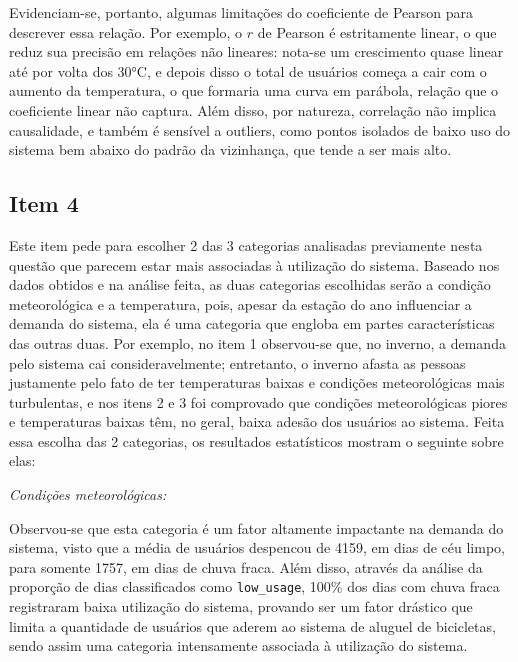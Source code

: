 \documentclass[a4paper, 12pt, titlepage]{article}
\begin{document}
Evidenciam-se, portanto, algumas limitações do coeficiente de Pearson para descrever essa relação. Por exemplo, o $r$ de Pearson é estritamente linear, o que reduz sua precisão em relações não lineares: nota-se um crescimento quase linear até por volta dos 30°C, e depois disso o total de usuários começa a cair com o aumento da temperatura, o que formaria uma curva em parábola, relação que o coeficiente linear não captura. Além disso, por natureza, correlação não implica causalidade, e também é sensível a outliers, como pontos isolados de baixo uso do sistema bem abaixo do padrão da vizinhança, que tende a ser mais alto.


\subsection*{Item 4}
Este item pede para escolher 2 das 3 categorias analisadas previamente nesta questão que parecem estar mais associadas à utilização do sistema. Baseado nos dados obtidos e na análise feita, as duas categorias escolhidas serão a condição meteorológica e a temperatura, pois, apesar da estação do ano influenciar a demanda do sistema, ela é uma categoria que engloba em partes características das outras duas. Por exemplo, no item 1 observou-se que, no inverno, a demanda pelo sistema cai consideravelmente; entretanto, o inverno afasta as pessoas justamente pelo fato de ter temperaturas baixas e condições meteorológicas mais turbulentas, e nos itens 2 e 3 foi comprovado que condições meteorológicas piores e temperaturas baixas têm, no geral, baixa adesão dos usuários ao sistema. Feita essa escolha das 2 categorias, os resultados estatísticos mostram o seguinte sobre elas:

\textit{Condições meteorológicas:}

Observou-se que esta categoria é um fator altamente impactante na demanda do sistema, visto que a média de usuários despencou de 4159, em dias de céu limpo, para somente 1757, em dias de chuva fraca. Além disso, através da análise da proporção de dias classificados como \texttt{low\_usage}, 100\% dos dias com chuva fraca registraram baixa utilização do sistema, provando ser um fator drástico que limita a quantidade de usuários que aderem ao sistema de aluguel de bicicletas, sendo assim uma categoria intensamente associada à utilização do sistema.
\end{document}

